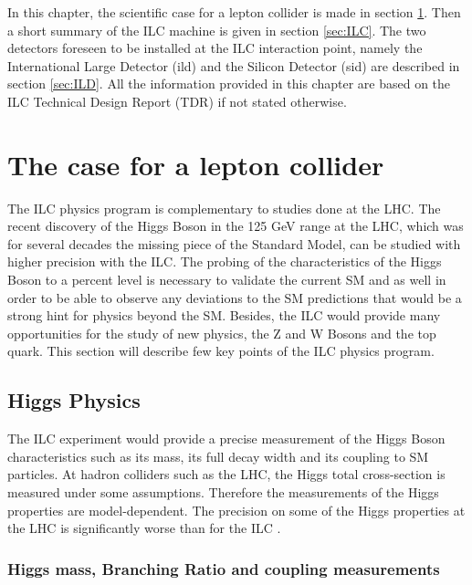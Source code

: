 In this chapter, the scientific case for a lepton collider is made in section \ref{sec:ILC_Physics}. Then a short summary of the ILC machine is given in section \ref{sec:ILC}. The two detectors foreseen to be installed at the ILC interaction point, namely the International Large Detector (\acrshort{ild}) and the Silicon Detector (\acrshort{sid}) are described in section \ref{sec:ILD}. All the information provided in this chapter are based on the ILC Technical Design Report (TDR) \cite{ILC_TDR_Vol1, ILC_TDR_Vol2, ILC_TDR_Vol3.1, ILC_TDR_Vol3.2, ILC_TDR_Vol4} if not stated otherwise.

\section{The case for a lepton collider}
\label{sec:ILC_Physics}

The ILC physics program is complementary to studies done at the LHC. The recent discovery of the Higgs Boson in the 125 GeV range at the LHC, which was for several decades the missing piece of the Standard Model, can be studied with higher precision with the ILC. The probing of the characteristics of the Higgs Boson to a percent level is necessary to validate the current SM and as well in order to be able to observe any deviations to the SM predictions that would be a strong hint for physics beyond the SM. Besides, the ILC would provide many opportunities for the study of new physics, the Z and W Bosons and the top quark. This section will describe few key points of the ILC physics program.

\subsection{Higgs Physics}

The ILC experiment would provide a precise measurement of the Higgs Boson characteristics such as its mass, its full decay width and its coupling to SM particles. At hadron colliders such as the LHC, the Higgs total cross-section is measured under some assumptions. Therefore the measurements of the Higgs properties are model-dependent. The precision on some of the Higgs properties at the LHC is significantly worse than for the ILC \cite{Fujii:2015jha}.

\subsubsection{Higgs mass, Branching Ratio and coupling measurements}

